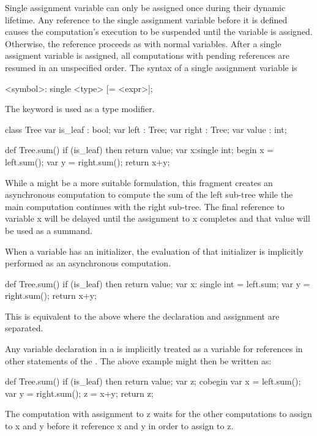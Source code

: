 Single assignment variable can only be assigned once during their
dynamic lifetime.  Any reference to the single assignment variable
before it is defined causes the computation's execution to be
suspended until the variable is assigned. Otherwise, the reference
proceeds as with normal variables.  After a single assigment variable is
assigned, all computations with pending references are resumed in an
unspecified order. The syntax of a single assignment variable is
\begin{chapel}
[var] <symbol>: single <type> [= <expr>];
\end{chapel}
The keyword  is used as a type modifier. 

\begin{example}
\begin{chapel}
class Tree {
  var is_leaf : bool;
  var left    : Tree;
  var right   : Tree;
  var value   : int;
}

def Tree.sum() {
  if (is_leaf) then return value;
  var x:single int;
  begin x = left.sum();
  var y = right.sum();
  return x+y;
}
\end{chapel}
While a  might be a more suitable formulation, this
fragment creates an asynchronous computation to compute the sum of the
left sub-tree while the main computation continues with the right
sub-tree. The final reference to variable x will be delayed until the
assignment to x completes and that value will be used as a summand.
\end{example}

When a  variable has an initializer, the evaluation of
that initializer is implicitly performed as an asynchronous
computation. 
\begin{example}
\begin{chapel}
def Tree.sum() {
  if (is_leaf) then return value;
  var x: single int = left.sum;
  var y = right.sum();
  return x+y;
}
\end{chapel}
This is equivalent to the above where the declaration and assignment are
separated.
\end{example}

Any variable declaration in a  is implicitly treated as
a  variable for references in other statements of the
.  The above example might then be written as:
\begin{example}
\begin{chapel}
def Tree.sum() {
  if (is_leaf) then return value;
  var z;
  cobegin {
    var x = left.sum();
    var y = right.sum();
    z = x+y;
  }
  return z;
}
\end{chapel}
The computation with assignment to z waits for the other computations 
to assign to x and y before it reference x and y in order to assign to z.
\end{example}
